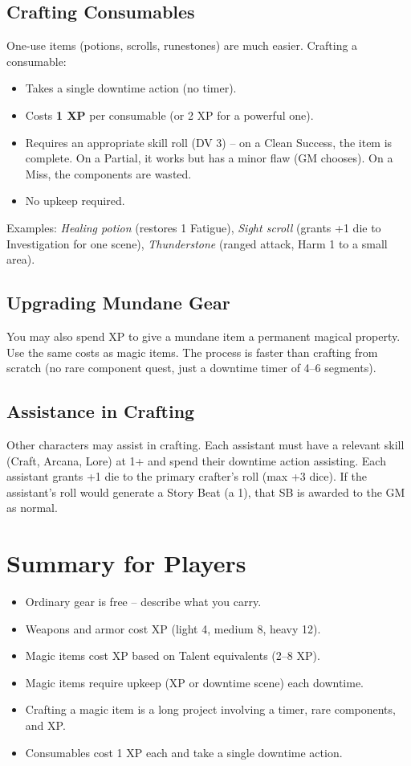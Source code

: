 \subsection{Crafting Consumables}
One-use items (potions, scrolls, runestones) are much easier. Crafting a consumable:
\begin{itemize}
  \item Takes a single downtime action (no timer).
  \item Costs \textbf{1 XP} per consumable (or 2 XP for a powerful one).
  \item Requires an appropriate skill roll (DV 3) -- on a Clean Success, the item is complete. On a Partial, it works but has a minor flaw (GM chooses). On a Miss, the components are wasted.
  \item No upkeep required.
\end{itemize}
Examples: \emph{Healing potion} (restores 1 Fatigue), \emph{Sight scroll} (grants +1 die to Investigation for one scene), \emph{Thunderstone} (ranged attack, Harm 1 to a small area).

\subsection{Upgrading Mundane Gear}
You may also spend XP to give a mundane item a permanent magical property. Use the same costs as magic items. The process is faster than crafting from scratch (no rare component quest, just a downtime timer of 4--6 segments).

\subsection{Assistance in Crafting}
Other characters may assist in crafting. Each assistant must have a relevant skill (Craft, Arcana, Lore) at 1+ and spend their downtime action assisting. Each assistant grants +1 die to the primary crafter's roll (max +3 dice). If the assistant's roll would generate a Story Beat (a 1), that SB is awarded to the GM as normal.

\section{Summary for Players}
\begin{itemize}
  \item Ordinary gear is free -- describe what you carry.
  \item Weapons and armor cost XP (light 4, medium 8, heavy 12).
  \item Magic items cost XP based on Talent equivalents (2--8 XP).
  \item Magic items require upkeep (XP or downtime scene) each downtime.
  \item Crafting a magic item is a long project involving a timer, rare components, and XP.
  \item Consumables cost 1 XP each and take a single downtime action.
\end{itemize}

